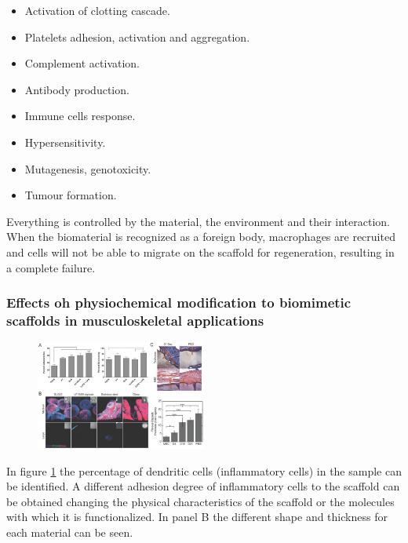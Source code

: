 	\begin{multicols}{2}
		\begin{itemize}
			\item Activation of clotting cascade.
			\item Platelets adhesion, activation and aggregation.
			\item Complement activation.
			\item Antibody production.
			\item Immune cells response.
			\item Hypersensitivity.
			\item Mutagenesis, genotoxicity.
			\item Tumour formation.
		\end{itemize}
	\end{multicols}

	Everything is controlled by the material, the environment and their interaction.
	When the biomaterial is recognized as a foreign body, macrophages are recruited and cells will not be able to migrate on the scaffold for regeneration, resulting in a complete failure.

		\subsubsection{Effects oh physiochemical modification to biomimetic scaffolds in musculoskeletal applications}

		\begin{figure}[ht]
			\centering
			\includegraphics[width=0.5\textwidth]{muscosk}
			\caption{\label{fig:muscosk}}
		\end{figure}

		In figure \ref{fig:muscosk} the percentage of dendritic cells (inflammatory cells) in the sample can be identified.
		A different adhesion degree of inflammatory cells to the scaffold can be obtained changing the physical characteristics of the scaffold or the molecules with which it is functionalized.
		In panel B the different shape and thickness for each material can be seen.

